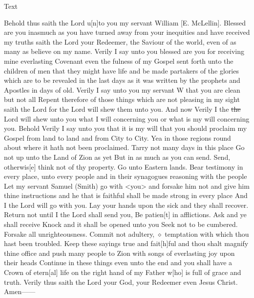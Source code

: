 {				%
			
			\begin{description}
				\item[Text]
			\end{description}
			
				Behold thus saith the Lord u[n]to you my servant William [E. McLellin]. Blessed are you inasmuch as you have turned away from your inequities and have received my truths saith the Lord your Redeemer, the Saviour of the world, even of as many as believe on my name. Verily I say unto you blessed are you for receiving mine everlasting Covenant even the fulness of my Gospel sent forth unto the children of men that they might have life and be made partakers of the glories which are to be revealed in the last days as it was written by the prophets and Apostles in days of old. Verily I say unto you my servant W that you are clean but not all Repent therefore of those things which are not pleasing in my sight saith the Lord for the Lord will shew them unto you. And now Verily I the \sout{the} Lord will shew unto you what I will concerning you or what is my will concerning you. Behold Verily I say unto you that it is my will that you should proclaim my Gospel from land to land and from City to City. Yea in those regions round about where it hath not been proclaimed. Tarry not many days in this place Go not up unto the Land of Zion as yet But in as much as you can send. Send, otherwis[e] think not of thy property. Go unto Eastern lands. Bear testimony in every place, unto every people and in their synagogues reasoning with the people Let my servant Samuel (Smith) go with <you> and forsake him not and give him thine instructions and he that is faithful shall be made strong in every place And I the Lord will go with you. Lay your hands upon the sick and they shall recover. Return not until I the Lord shall send you, Be patien[t] in afflictions. Ask and ye shall receive Knock and it shall be opened unto you Seek not to be cumbered. Forsake all unrighteousness. Commit not adultery, $\diamond$ temptation with which thou hast been troubled. Keep these sayings true and fait[h]ful and thou shalt magnify thine office and push many people to Zion with songs of everlasting joy upon their heads Continue in these things even unto the end and you shall have a Crown of etern[al] life on the right hand of my Father w[ho] is full of grace and truth. Verily thus saith the Lord your God, your Redeemer even Jesus Christ. Amen------
				
}
